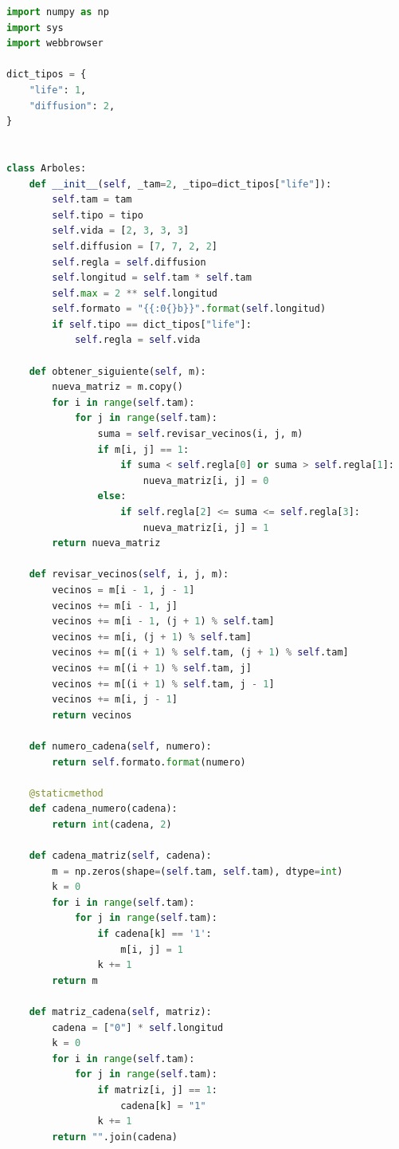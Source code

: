 \begin{lstlisting}[language=Python]
 import numpy as np
import sys
import webbrowser

dict_tipos = {
    "life": 1,
    "diffusion": 2,
}


class Arboles:
    def __init__(self, _tam=2, _tipo=dict_tipos["life"]):
        self.tam = tam
        self.tipo = tipo
        self.vida = [2, 3, 3, 3]
        self.diffusion = [7, 7, 2, 2]
        self.regla = self.diffusion
        self.longitud = self.tam * self.tam
        self.max = 2 ** self.longitud
        self.formato = "{{:0{}b}}".format(self.longitud)
        if self.tipo == dict_tipos["life"]:
            self.regla = self.vida

    def obtener_siguiente(self, m):
        nueva_matriz = m.copy()
        for i in range(self.tam):
            for j in range(self.tam):
                suma = self.revisar_vecinos(i, j, m)
                if m[i, j] == 1:
                    if suma < self.regla[0] or suma > self.regla[1]:
                        nueva_matriz[i, j] = 0
                else:
                    if self.regla[2] <= suma <= self.regla[3]:
                        nueva_matriz[i, j] = 1
        return nueva_matriz

    def revisar_vecinos(self, i, j, m):
        vecinos = m[i - 1, j - 1]
        vecinos += m[i - 1, j]
        vecinos += m[i - 1, (j + 1) % self.tam]
        vecinos += m[i, (j + 1) % self.tam]
        vecinos += m[(i + 1) % self.tam, (j + 1) % self.tam]
        vecinos += m[(i + 1) % self.tam, j]
        vecinos += m[(i + 1) % self.tam, j - 1]
        vecinos += m[i, j - 1]
        return vecinos

    def numero_cadena(self, numero):
        return self.formato.format(numero)

    @staticmethod
    def cadena_numero(cadena):
        return int(cadena, 2)

    def cadena_matriz(self, cadena):
        m = np.zeros(shape=(self.tam, self.tam), dtype=int)
        k = 0
        for i in range(self.tam):
            for j in range(self.tam):
                if cadena[k] == '1':
                    m[i, j] = 1
                k += 1
        return m

    def matriz_cadena(self, matriz):
        cadena = ["0"] * self.longitud
        k = 0
        for i in range(self.tam):
            for j in range(self.tam):
                if matriz[i, j] == 1:
                    cadena[k] = "1"
                k += 1
        return "".join(cadena)


\end{lstlisting}

